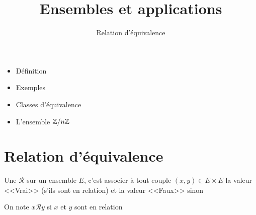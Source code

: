 






\title{{\bf Ensembles et applications}}
\subtitle{Relation d'équivalence}

\begin{frame}
  
  \debutmontitre

  \pause

{\footnotesize
\hfill
{}
\begin{minipage}{0.6\textwidth}
  \begin{itemize}
    \item<3-> Définition
    \item<4-> Exemples
    \item<5-> Classes d'équivalence
    \item<6-> L’ensemble $\mathbb{Z}/n\mathbb{Z}$
  \end{itemize}
\end{minipage}
}

\end{frame}
\setcounter{framenumber}{0}

\section{Relation d'équivalence}

\begin{frame}



Une  $\mathcal{R}$ sur un ensemble $E$, c'est associer à tout couple 
$(x,y)\in E \times E$ la valeur <<Vrai>> (s'ils sont en relation) et la valeur <<Faux>> sinon

\pause

On note $x\mathcal{R}y$ si $x$ et $y$ sont en relation 

\pause


\end{frame}

